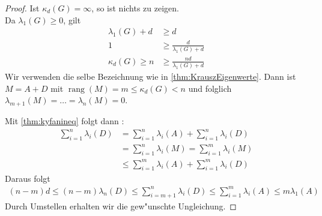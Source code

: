\begin{proof}
  Ist $\kappa_{d}(G) = \infty$, so ist nichts zu zeigen. \\
   Da $\lambda_{1}(G) \geq 0$, gilt 
  \begin{align*}
    \lambda_{1}(G) + d &\geq d \\
    1 &\geq \frac{d}{\lambda_{1}(G) + d }\\
    \kappa_{d}(G) \geq n &\geq \frac{nd}{\lambda_{1}(G)+d}
  \end{align*}
  Wir verwenden die selbe Bezeichnung wie in \ref{thm:KrauszEigenwerte}. Dann ist $M=A+D$ mit $\operatorname{rang} (M) = m \leq \kappa_{d}(G) < n$ und folglich $\lambda_{m+1}(M) = \dots = \lambda_{n}(M) = 0$. 

  Mit \ref{thm:kyfanineq} folgt dann : 
  \begin{align*}
    \sum\limits_{i=1}^{n} \lambda_{i}(D) &=\sum\limits_{i=1}^{n} \lambda_{i}(A) +\sum\limits_{i=1}^{n}  \lambda_{i}(D) \\
    &=\sum\limits_{i=1}^{n} \lambda_{i}(M) =\sum\limits_{i=1}^{m} \lambda_{i}(M) \\
    &\leq \sum\limits_{i=1}^{m} \lambda_{i}(A) +\sum\limits_{i=1}^{m} \lambda_{i}(D)
  \end{align*}
  Daraus folgt 
  \begin{align*}
    (n-m) d \leq (n-m) \lambda_n(D) \leq \sum\limits_{i=m+1}^{n} \lambda_{i}(D) \leq\sum\limits_{i=1}^{m} \lambda_{i}(A) \leq m\lambda_{1}(A)
  \end{align*}
  Durch Umstellen erhalten wir die gew"unschte Ungleichung.
\end{proof}
